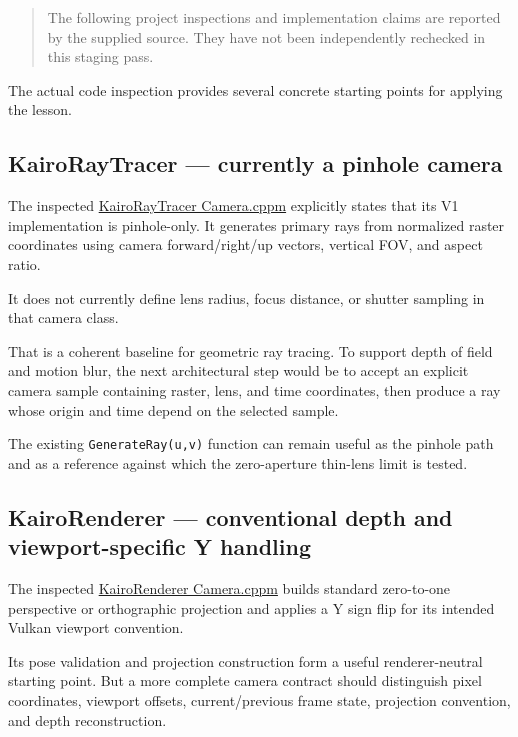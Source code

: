 \begin{quote}
The following project inspections and implementation claims are reported by the supplied source. They have not been independently rechecked in this staging pass.
\end{quote}

The actual code inspection provides several concrete starting points for applying the lesson.

\subsection{KairoRayTracer --- currently a pinhole camera}\label{02-foundations-ii-ch037-kairoraytracer-currently-a-pinhole-camera}

The inspected \href{https://github.com/swayam8624/KairoRayTracer/blob/main/Camera.cppm?utm_source=chatgpt.com}{KairoRayTracer Camera.cppm} explicitly states that its V1 implementation is pinhole-only. It generates primary rays from normalized raster coordinates using camera forward/right/up vectors, vertical FOV, and aspect ratio.

It does not currently define lens radius, focus distance, or shutter sampling in that camera class.

That is a coherent baseline for geometric ray tracing. To support depth of field and motion blur, the next architectural step would be to accept an explicit camera sample containing raster, lens, and time coordinates, then produce a ray whose origin and time depend on the selected sample.

The existing \texttt{GenerateRay(u,v)} function can remain useful as the pinhole path and as a reference against which the zero-aperture thin-lens limit is tested.

\subsection{KairoRenderer --- conventional depth and viewport-specific Y handling}\label{02-foundations-ii-ch037-kairorenderer-conventional-depth-and-viewport-specific-y-handling}

The inspected \href{https://github.com/swayam8624/KairoRenderer/blob/main/Camera.cppm?utm_source=chatgpt.com}{KairoRenderer Camera.cppm} builds standard zero-to-one perspective or orthographic projection and applies a Y sign flip for its intended Vulkan viewport convention.

Its pose validation and projection construction form a useful renderer-neutral starting point. But a more complete camera contract should distinguish pixel coordinates, viewport offsets, current/previous frame state, projection convention, and depth reconstruction.

